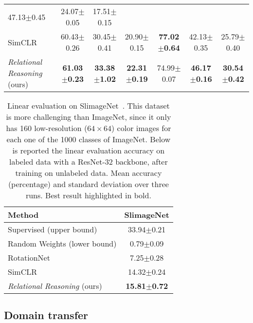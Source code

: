 \documentclass{article}
\begin{document}
\begin{table}[H]
\begin{adjustbox}{width=\columnwidth,center}
\begin{tabular}{lcccccc}
    47.13$\pm$\small{0.45} & 24.07$\pm$\small{0.05}  & 17.51$\pm$\small{0.15} \\
    SimCLR \citep{chen2020simple} & 
    60.43$\pm$\small{0.26} & 30.45$\pm$\small{0.41}  & 20.90$\pm$\small{0.15} &
    \textbf{77.02$\pm$\small{0.64}} & 42.13$\pm$\small{0.35}  & 25.79$\pm$\small{0.40} \\  
    \emph{Relational Reasoning} (ours)  & \textbf{61.03$\pm$\small{0.23}} & \textbf{33.38$\pm$\small{1.02}}  & \textbf{22.31$\pm$\small{0.19}} &
    74.99$\pm$\small{0.07} & \textbf{46.17$\pm$\small{0.16}}  & \textbf{30.54$\pm$\small{0.42}} \\
    \bottomrule
  \end{tabular}
 \end{adjustbox}
\end{table}

\begin{table}[H]
 \caption{Linear evaluation on SlimageNet~\citep{antoniou2020defining}. This dataset is more challenging than ImageNet, since it only has 160 low-resolution ($64 \times 64$) color images for each one of the 1000 classes of ImageNet. Below is reported the linear evaluation accuracy on labeled data with a ResNet-32 backbone, after training on unlabeled data. Mean accuracy (percentage) and standard deviation over three runs. Best result highlighted in bold.}
 \label{tab:linear_evaluation_slim}
 \begin{adjustbox}{width=0.40\columnwidth,center}
  \centering
  \begin{tabular}{lc}
    \toprule
    \textbf{Method} & \textbf{SlimageNet} \\
    \midrule
    Supervised (upper bound) & 33.94$\pm$\small{0.21} \\
    Random Weights (lower bound) & 0.79$\pm$\small{0.09} \\
    \midrule
    RotationNet \citep{gidaris2018unsupervised} & 7.25$\pm$\small{0.28} \\
    SimCLR \citep{chen2020simple} & 14.32$\pm$\small{0.24} \\
    \emph{Relational Reasoning} (ours)  & \textbf{15.81$\pm$\small{0.72}} \\
    \bottomrule
  \end{tabular}
 \end{adjustbox}
\end{table}

\subsection{Domain transfer}\label{appendix:additional_domain_transfer}
\end{document}
